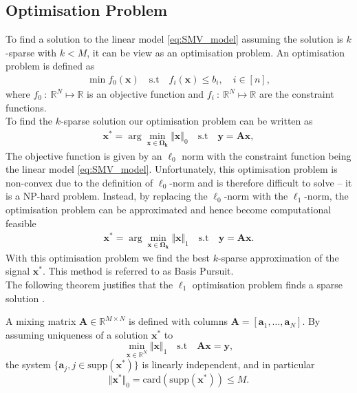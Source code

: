 \subsection{Optimisation Problem}\label{sec:opti}
To find a solution to the linear model \eqref{eq:SMV_model} assuming the solution is $k$-sparse with $k < M$, it can be view as an optimisation problem. An optimisation problem is defined as
\begin{align*}
\min f_0 (\mathbf{x}) \quad \text{s.t} \quad f_i (\mathbf{x}) \leq b_i, \quad i \in [n],
\end{align*}
where $f_0 \ : \ \mathbb{R}^N \mapsto \mathbb{R}$ is an objective function and $f_i \ : \ \mathbb{R}^N \mapsto \mathbb{R}$ are the constraint functions. 
\\
To find the $k$-sparse solution our optimisation problem can be written as
\begin{align*}
\textbf{x}^\ast = \arg \min_{\textbf{x}\in \boldsymbol{\Omega_{k}}} \Vert \mathbf{x} \Vert_0 \quad \text{s.t} \quad \mathbf{y} = \mathbf{Ax},
\end{align*}
The objective function is given by an $\ell_0$ norm with the constraint function being the linear model \eqref{eq:SMV_model}. Unfortunately, this optimisation problem is non-convex due to the definition of $\ell_0$-norm and is therefore difficult to solve -- it is a NP-hard problem. Instead, by replacing the $\ell_0$-norm with the $\ell_1$-norm, the optimisation problem can be approximated and hence become computational feasible \cite[p. 27]{CS}
\begin{align}\label{eq:SMV_p1}
\textbf{x}^\ast = \arg \min_{\textbf{x}\in  \boldsymbol{\Omega_{k}}} \Vert \mathbf{x} \Vert_1 \quad \text{s.t} \quad \mathbf{y} = \mathbf{Ax}.
\end{align} 
With this optimisation problem we find the best $k$-sparse approximation of the signal $\mathbf{x}^\ast$. This method is referred to as Basis Pursuit. 
\\
The following theorem justifies that the $\ell_1$ optimisation problem finds a sparse solution \cite[p. 62-63]{FR}.
\begin{theorem}
A mixing matrix $\mathbf{A} \in \mathbb{R}^{M \times N}$ is defined with columns $\textbf{A} = [\textbf{a}_1, \dots, \textbf{a}_N]$. By assuming uniqueness of a solution $\textbf{x}^{\ast}$ to
$$
\min_{\textbf{x} \in \mathbb{R}^N} \Vert \textbf{x} \Vert_1 \quad \text{s.t} \quad \textbf{Ax} = \textbf{y},
$$
the system $\{ \textbf{a}_j, j \in \text{supp} ( \textbf{x}^{\ast})\}$ is linearly independent, and in particular
$$
\Vert \textbf{x}^{\ast} \Vert_0 = \text{card}(\text{supp} (\textbf{x}^{\ast})) \leq M.
$$
\end{theorem}
